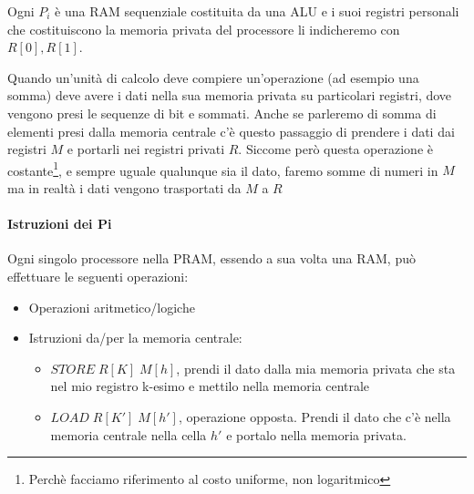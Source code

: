 Ogni $P_i$ è una RAM sequenziale costituita da una ALU e i suoi registri personali che costituiscono la memoria privata del processore li indicheremo con $R[0], R[1]$. 

\begin{osservazione}
  Quando un'unità di calcolo deve compiere un'operazione (ad esempio una somma) deve avere i dati nella sua memoria privata su particolari registri, dove vengono presi le sequenze di bit e sommati. Anche se parleremo di somma di elementi presi dalla memoria centrale c'è questo passaggio di prendere i dati dai registri $M$ e portarli nei registri privati $R$. Siccome però questa operazione è costante\footnote{Perchè facciamo riferimento al costo uniforme, non logaritmico}, e sempre uguale qualunque sia il dato, faremo somme di numeri in $M$ ma in realtà i dati vengono trasportati da $M$ a $R$  
\end{osservazione}

\paragraph{Istruzioni dei Pi}
Ogni singolo processore nella PRAM, essendo a sua volta una RAM, può effettuare le seguenti operazioni:
\begin{itemize}
    \item Operazioni aritmetico/logiche
    \item Istruzioni da/per la memoria centrale:
    \begin{itemize}
        \item $STORE\;R[K]\;M[h]$, prendi il dato dalla mia memoria privata che sta nel mio registro k-esimo e mettilo nella memoria centrale
        \item $LOAD\;R[K\prime]\;M[h\prime]$, operazione opposta. Prendi il dato che c'è nella memoria centrale nella cella $h\prime$ e portalo nella memoria privata.
    \end{itemize}
\end{itemize}

